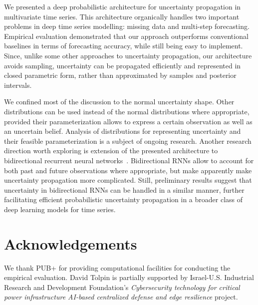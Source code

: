 \documentclass[runningheads]{llncs}
\begin{document}
We presented a deep probabilistic architecture for uncertainty
propagation in multivariate time series. This architecture
organically handles two important problems in deep time series
modelling: missing data and multi-step forecasting. Empirical
evaluation demonstrated that our approach outperforms
conventional baselines in terms of forecasting accuracy, while
still being easy to implement. Since, unlike some other
approaches to uncertainty propagation, our architecture
avoids sampling, uncertainty can be propagated efficiently and
represented in closed parametric form, rather than approximated
by samples and posterior intervals.

We confined most of the discussion to the normal uncertainty shape.
Other distributions can be used instead of the normal
distributions where appropriate, provided their parameterization
allows to express a certain observation as well as an uncertain
belief. Analysis of distributions for representing uncertainty
and their feasible parameterization is a subject of ongoing
research. Another research direction worth exploring is
extension of the presented architecture to bidirectional
recurrent neural networks~\cite{BRH15}. Bidirectional RNNs allow
to account for both past and future observations where
appropriate, but make apparently make uncertainty propagation
more complicated. Still, preliminary results suggest that
uncertainty in bidirectional RNNs can be handled in a similar
manner, further facilitating efficient probabilistic uncertainty
propagation in a broader class of deep learning models for time
series.

\section*{Acknowledgements}

We thank PUB+ for providing computational facilities for
conducting the empirical evaluation. David Tolpin is partially
supported by Israel-U.S. Industrial Research and Development
Foundation's \textit{Cybersecurity technology for critical power
infrastructure AI-based centralized defense and edge resilience}
project.

\nocite{BDS21}
\nocite{CPK+18}
\nocite{SYG+19}
\nocite{KC18}
\nocite{LKW16}
\nocite{BRH15}
\nocite{AV20}
\nocite{FSK+16}
\nocite{MFS+21}
\nocite{FSP+16}
\nocite{SZN+19}
\nocite{LYY+19}
\nocite{CYP+21}
\nocite{YB21}
\nocite{CKD+15}
\nocite{HS97}
\nocite{CMB+14}
\nocite{WSY+21}



\end{document}
